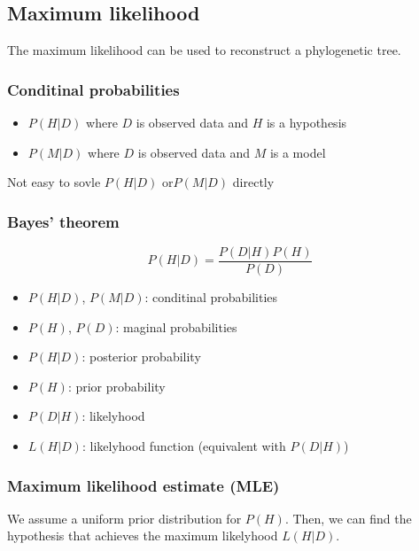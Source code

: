 %
%

%
%
\subsection{Maximum likelihood}
The maximum likelihood can be used to reconstruct a phylogenetic tree.

%
%
\subsubsection*{Conditinal probabilities}
\begin{itemize}
\item $P(H|D)$ where $D$ is observed data and $H$ is a hypothesis
\item $P(M|D)$ where $D$ is observed data and $M$ is a model
\end{itemize}

\noindent
Not easy to sovle $P(H|D)$ or$ P(M|D)$ directly

%
%
\subsubsection*{Bayes' theorem}
\medskip 

\[
P(H|D) = \dfrac{P(D|H)P(H)}{P(D)}
\]

\begin{itemize}
\item $P(H|D)$, $P(M|D)$: conditinal probabilities
\item $P(H)$, $P(D)$: maginal probabilities
\item $P(H|D)$: posterior probability
\item $P(H)$: prior probability
\item $P(D|H)$: likelyhood
\item $L(H|D)$: likelyhood function (equivalent with $P(D|H)$)
\end{itemize}

%
%
\subsubsection*{Maximum likelihood estimate (MLE)}
We assume a uniform prior distribution for $P(H)$. Then, we can find the hypothesis that achieves the maximum likelyhood $L(H|D)$. \\


